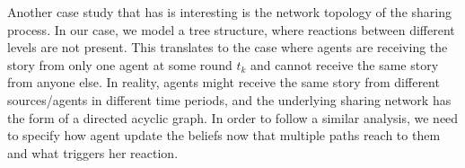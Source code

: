 Another case study that has is interesting is the network topology of the sharing process. In our case, we model a tree structure, where reactions between different levels are not present. This translates to the case where agents are receiving the story from only one agent at some round $t_k$ and cannot receive the same story from anyone else. In reality, agents might receive the same story from different sources/agents in different time periods, and the underlying sharing network has the form of a directed acyclic graph. In order to follow a similar analysis, we need to specify how agent update the beliefs now that multiple paths reach to them and what triggers her reaction. 

